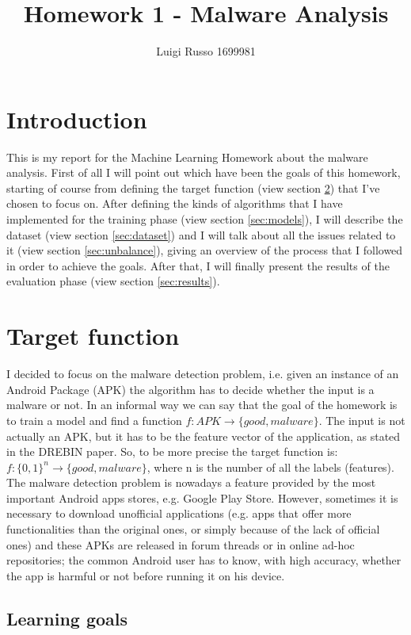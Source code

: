 \documentclass[12pt]{article}
\title{Homework 1 - Malware Analysis}
\author{Luigi Russo 1699981}
\begin{document}
	
\maketitle
	
\section{Introduction}
This is my report for the Machine Learning Homework about the malware analysis. First of all I will point out which have been the goals of this homework, starting of course from defining the target function (view section \ref{sec:target_function}) that I've chosen to focus on. After defining the kinds of algorithms that I have implemented for the training phase (view section \ref{sec:models}), I will describe the dataset (view section \ref{sec:dataset}) and I will talk about all the issues related to it (view section \ref{sec:unbalance}), giving an overview of the process that I followed in order to achieve the goals. After that, I will finally present the results of the evaluation phase (view section \ref{sec:results}).

\section{Target function}
\label{sec:target_function}
I decided to focus on the malware detection problem, i.e. given an instance of an Android Package (APK) the algorithm has to decide whether the input is a malware or not. In an informal way we can say that the goal of the homework is to train a model and find a function
$ f: APK \rightarrow \{good, malware\} $.
The input is not actually an APK, but it has to be the feature vector of the application, as stated in the DREBIN \cite{DREBIN} paper. So, to be more precise the target function is:
$ f: \{0,1\}^n  \rightarrow \{good, malware\} $, where n is the number of all the labels (features).
The malware detection problem is nowadays a feature provided by the most important Android apps stores, e.g. Google Play Store. However, sometimes it is necessary to download unofficial applications (e.g. apps that offer more functionalities than the original ones, or simply because of the lack of official ones) and these APKs are released in forum threads or in online ad-hoc repositories; the common Android user has to know, with high accuracy, whether the app is harmful or not before running it on his device.

\subsection{Learning goals}
\end{document}
